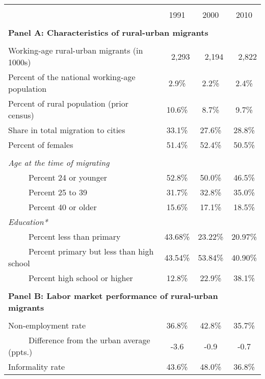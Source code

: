 \begin{tabular}{lccc}
\toprule &       &       &  \\
      & 1991  & 2000  & 2010 \bigstrut[b]\\
\cline{2-4}      &       &       &  \bigstrut[t]\\
\multicolumn{4}{l}{\textbf{Panel A: Characteristics of rural-urban migrants}} \\
      &       &       &  \\
Working-age rural-urban migrants (in 1000s) & \multicolumn{1}{r}{               2,293 } & \multicolumn{1}{r}{               2,194 } & \multicolumn{1}{r}{               2,822 } \\
Percent of the national working-age population & 2.9\% & 2.2\% & 2.4\% \\
Percent of rural population (prior census) & 10.6\% & 8.7\% & 9.7\% \\
Share in total migration to cities & 33.1\% & 27.6\% & 28.8\% \\
Percent of females & 51.4\% & 52.4\% & 50.5\% \\
      &       &       &  \\
\textit{Age at the time of migrating} &       &       &  \\
~~~~~Percent 24 or younger & 52.8\% & 50.0\% & 46.5\% \\
~~~~~Percent 25 to 39 & 31.7\% & 32.8\% & 35.0\% \\
\medskip ~~~~~Percent 40 or older & 15.6\% & 17.1\% & 18.5\% \\
\textit{Education*} &       &       &  \\
~~~~~Percent less than primary & 43.68\% & 23.22\% & 20.97\% \\
~~~~~Percent primary but less than high school                                                 & 43.54\% & 53.84\% & 40.90\% \\
~~~~~Percent high school or higher & 12.8\% & 22.9\% & 38.1\% \\
      &       &       &  \\
\multicolumn{4}{l}{\textbf{Panel B: Labor market performance of rural-urban migrants}} \\
      &       &       &  \\
Non-employment rate & 36.8\% & 42.8\% & 35.7\% \\
~~~~~Difference from the urban average (ppts.) & -3.6 & -0.9 & -0.7 \\
Informality rate & 43.6\% & 48.0\% & 36.8\% \\

\end{tabular}

